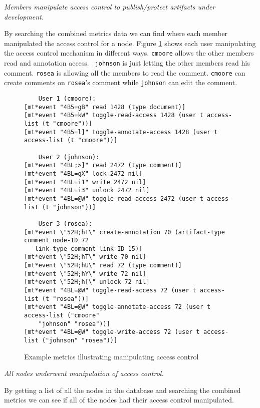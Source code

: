 \begin{itemizenoindent}
\item{\em Members manipulate access control to publish/protect artifacts
  under development.}

  By searching the combined metrics data we can find where each member
  manipulated the access control for a node.  Figure \ref{fig:manip} shows
  each user manipulating the access control mechanism in different ways.
  {\tt cmoore} allows the other members read and annotation access.  {\tt
  johnson} is just letting the other members read his comment.  {\tt rosea}
  is allowing all the members to read the comment.  {\tt cmoore} can create
  comments on {\tt rosea}'s comment while {\tt johnson} can edit the comment.

\begin{figure}[htb]
  \small
  \begin{verbatim}
    User 1 (cmoore):
[mt*event "4B5=gB" read 1428 (type document)]
[mt*event "4B5=kW" toggle-read-access 1428 (user t access-list (t "cmoore"))]
[mt*event "4B5=l]" toggle-annotate-access 1428 (user t access-list (t "cmoore"))]

    User 2 (johnson):
[mt*event "4BL;>]" read 2472 (type comment)]
[mt*event "4BL=gX" lock 2472 nil]
[mt*event "4BL=i1" write 2472 nil]
[mt*event "4BL=i3" unlock 2472 nil]
[mt*event "4BL=@W" toggle-read-access 2472 (user t access-list (t "johnson"))]

    User 3 (rosea):
[mt*event \"52H;hT\" create-annotation 70 (artifact-type comment node-ID 72
   link-type comment link-ID 15)]
[mt*event \"52H;hT\" write 70 nil]
[mt*event \"52H;hU\" read 72 (type comment)]
[mt*event \"52H;hY\" write 72 nil]
[mt*event \"52H;h[\" unlock 72 nil]
[mt*event "4BL=@W" toggle-read-access 72 (user t access-list (t "rosea"))]
[mt*event "4BL=@W" toggle-annotate-access 72 (user t access-list ("cmoore"
    "johnson" "rosea"))]
[mt*event "4BL=@W" toggle-write-access 72 (user t access-list ("johnson" "rosea"))]
  \end{verbatim}
  \normalsize
  \caption{Example metrics illustrating manipulating access control}
  \label{fig:manip}
\end{figure}

\item{\em All nodes underwent manipulation of access control.}

  By getting a list of all the nodes in the database and searching the
  combined metrics we can see if all of the nodes had their access control
  manipulated.

\end{itemizenoindent}


